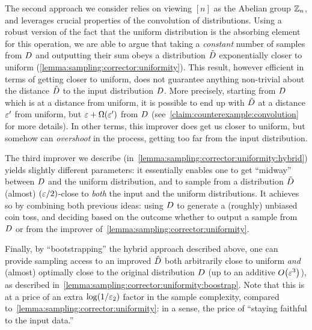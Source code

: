 The second approach we consider relies on viewing $[n]$ as the Abelian group $\mathbb{Z}_n$, 
and leverages crucial properties of the convolution of distributions. 
Using a robust version of the fact that the uniform distribution is the absorbing element for this operation, we are able to argue that taking a \emph{constant} number of samples from $D$ and outputting their sum obeys a distribution $\tilde{D}$ exponentially closer to uniform (\autoref{lemma:sampling:corrector:uniformity}). This result, however efficient in terms of getting closer to uniform, does not guarantee anything non-trivial about the distance $\tilde{D}$ to the input distribution $D$. More precisely, starting from $D$ which is at a distance \eps from uniform, it is possible to end up with $\tilde{D}$ at a distance $\varepsilon^\prime$ from uniform, but $\eps+\bigOmega{\eps^\prime}$ from $D$ (see~\autoref{claim:counterexample:convolution} for more details). In other terms, this improver does get us closer to uniform, but somehow can \emph{overshoot} in the process, getting too far from the input distribution.

The third improver we describe (in~\autoref{lemma:sampling:corrector:uniformity:hybrid}) yields slightly different parameters: it essentially enables one to get ``midway'' between $D$ and the uniform distribution, and to sample from a distribution $\tilde{D}$ (almost) $(\varepsilon/2)$-close to \emph{both} the input and the uniform distributions. It achieves so by combining both previous ideas: using $D$ to generate a (roughly) unbiased coin toss, and deciding based on the outcome whether to output a sample from $D$ or from the improver of~\autoref{lemma:sampling:corrector:uniformity}.

Finally, by ``bootstrapping'' the hybrid approach described above, one can provide sampling access to an improved $\hat{D}$ both arbitrarily close to uniform \emph{and} (almost) optimally close to the original distribution $D$ (up to an additive $\bigO{\eps^3}$), as described in~\autoref{lemma:sampling:corrector:uniformity:boostrap}. Note that this is at a price of an extra $\log(1/\varepsilon_2)$ factor in the sample complexity, compared to~\autoref{lemma:sampling:corrector:uniformity}: in a sense, the price of ``staying faithful to the input data.''


